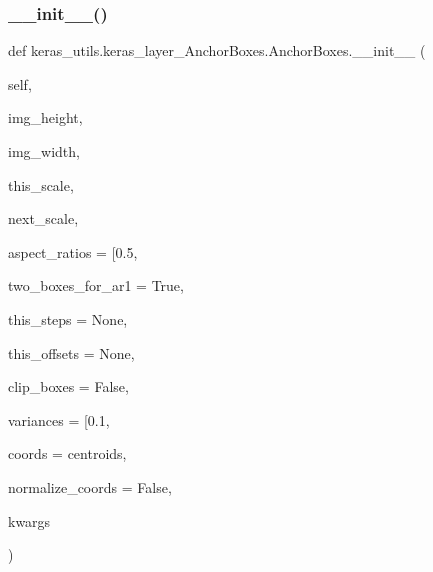 \subsubsection{\texorpdfstring{\+\_\+\+\_\+init\+\_\+\+\_\+()}{\_\_init\_\_()}}
{\footnotesize\ttfamily def keras\+\_\+utils.\+keras\+\_\+layer\+\_\+\+Anchor\+Boxes.\+Anchor\+Boxes.\+\_\+\+\_\+init\+\_\+\+\_\+ (\begin{DoxyParamCaption}\item[{}]{self,  }\item[{}]{img\+\_\+height,  }\item[{}]{img\+\_\+width,  }\item[{}]{this\+\_\+scale,  }\item[{}]{next\+\_\+scale,  }\item[{}]{aspect\+\_\+ratios = {\ttfamily \mbox{[}0.5},  }\item[{}]{two\+\_\+boxes\+\_\+for\+\_\+ar1 = {\ttfamily True},  }\item[{}]{this\+\_\+steps = {\ttfamily None},  }\item[{}]{this\+\_\+offsets = {\ttfamily None},  }\item[{}]{clip\+\_\+boxes = {\ttfamily False},  }\item[{}]{variances = {\ttfamily \mbox{[}0.1},  }\item[{}]{coords = {\ttfamily \textquotesingle{}centroids\textquotesingle{}},  }\item[{}]{normalize\+\_\+coords = {\ttfamily False},  }\item[{}]{kwargs }\end{DoxyParamCaption})}

